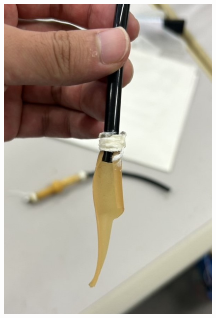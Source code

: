 \begin{figure}[h]
  \begin{minipage}{0.33\hsize}
    \centering
    \includegraphics[scale=0.3]{pic/5.jpg}
    \label{fig:gen}
  \end{minipage}  
  \begin{minipage}{0.33\hsize}
      \centering

\end{minipage}
\end{figure}
